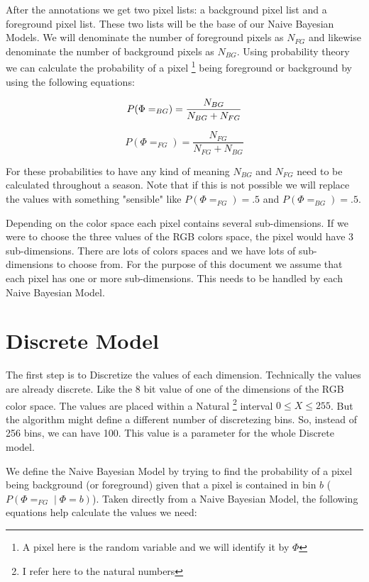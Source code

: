 \documentclass[a4paper,12pt]{report}
\begin{document}
After the annotations we get two pixel lists: a background pixel list and a
foreground pixel list. These two lists will be the base of our Naive Bayesian
Models. We will denominate the number of foreground pixels as $N_{FG}$ and
likewise denominate the number of background pixels as $N_{BG}$. Using probability
theory  we can calculate
the probability of a pixel \footnote{A pixel here is the random variable and we
will identify it by $\Phi$} being foreground or background by using the following
equations:

\begin{equation}
P(\Phi=_{BG}) = \frac{N_{BG}}{N_{BG}+N_{FG}} \\
\end{equation}

\begin{equation}
P(\Phi=_{FG}) = \frac{N_{FG}}{N_{FG}+N_{BG}}
\end{equation}

For these probabilities to have any kind of meaning $N_{BG}$ and $N_{FG}$ need
to be calculated throughout a season. Note that if this is not possible we will
replace the values with something "sensible" like $P(\Phi=_{FG})=.5$ and
$P(\Phi=_{BG})=.5$.

Depending on the color space each pixel contains several sub-dimensions. If we
were to choose the three values of the RGB colors space, the pixel would have 3
sub-dimensions. There are lots of colors spaces and we have lots of
sub-dimensions to choose from. For the purpose of this document we assume that
each pixel has one or more sub-dimensions. This needs to be handled by each
Naive Bayesian Model.

\section{Discrete Model}
The first step is to Discretize the values of each dimension. Technically the
values are already discrete. Like the 8 bit value of one of the dimensions of
the RGB color space. The values are placed within a Natural \footnote{I refer
here to the natural numbers} interval $0 \le X \le 255$. But the algorithm
might define a different number of discretezing bins. So, instead of 256 bins,
we can have 100. This value is a parameter for the whole Discrete model.

We define the Naive Bayesian Model by trying to find the probability of a pixel
being background (or foreground) given that a pixel is contained in bin $b$
($P(\Phi=_{FG} \mid \Phi=b)$). Taken directly from a Naive Bayesian Model, the
following equations help calculate the values we need:
\end{document}
